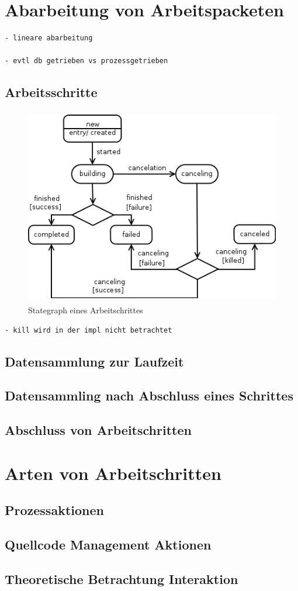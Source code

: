 \section{Abarbeitung von Arbeitspacketen}

\begin{verbatim}
- lineare abarbeitung

- evtl db getrieben vs prozessgetrieben
\end{verbatim}

\subsection{Arbeitsschritte}


\begin{figure}[ht] 
  \label{fig:lebenszyklus-arbeitsschritt}
  \begin{center}
      \includegraphics[height=3.4in]{imageinput/lebenszyklus-arbeitsschritt.png}
  \end{center}
  \caption{Stategraph eines Arbeitschrittes}
\end{figure}

\begin{verbatim}
- kill wird in der impl nicht betrachtet

\end{verbatim}


\subsection{Datensammlung zur Laufzeit}
\subsection{Datensammling nach Abschluss eines Schrittes}
\subsection{Abschluss von Arbeitschritten}


\section{Arten von Arbeitschritten}
\subsection{Prozessaktionen}
\subsection{Quellcode Management Aktionen}
\subsection{Theoretische Betrachtung Interaktion}

